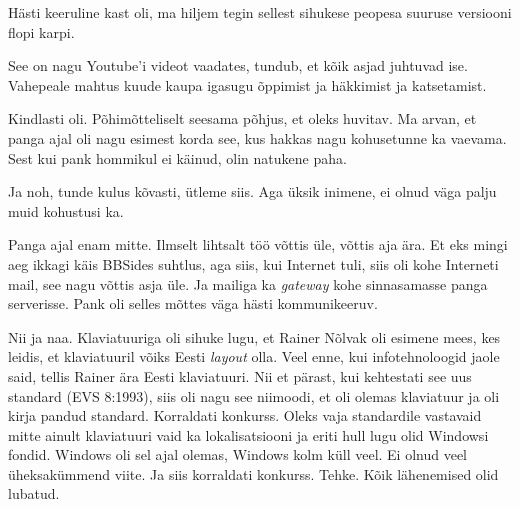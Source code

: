 Hästi keeruline kast oli, ma hiljem tegin  sellest sihukese peopesa suuruse 
versiooni flopi karpi.


See on nagu Youtube'i videot vaadates, tundub, et  kõik asjad juhtuvad ise. 
Vahepeale mahtus kuude kaupa igasugu õppimist ja häkkimist ja katsetamist.


Kindlasti oli. Põhimõtteliselt seesama põhjus, et oleks huvitav. Ma arvan, et 
panga ajal oli nagu esimest korda  see, kus hakkas nagu kohusetunne ka vaevama. 
Sest kui pank  hommikul ei käinud, olin natukene paha.

Ja noh, tunde kulus kõvasti, ütleme siis. Aga üksik inimene,  ei olnud  väga 
palju muid kohustusi ka.


Panga ajal enam mitte. Ilmselt lihtsalt töö võttis üle,  võttis aja ära. Et eks 
mingi aeg ikkagi käis BBSides suhtlus, aga siis, kui Internet tuli, siis oli 
kohe Interneti mail, see nagu võttis asja üle. Ja mailiga ka \emph{gateway} 
kohe sinnasamasse panga serverisse. Pank oli selles mõttes väga 
hästi kommunikeeruv.


Nii ja naa. Klaviatuuriga oli sihuke lugu, et Rainer Nõlvak oli esimene mees, kes leidis, et klaviatuuril võiks Eesti \emph{layout} 
olla. Veel enne, kui infotehnoloogid jaole said, tellis Rainer ära Eesti 
klaviatuuri. Nii et pärast, kui kehtestati see uus standard (EVS 8:1993), siis oli nagu see 
niimoodi, et oli olemas klaviatuur ja oli kirja pandud standard. Korraldati 
konkurss. Oleks vaja standardile vastavaid mitte ainult klaviatuuri vaid 
ka lokalisatsiooni ja eriti hull lugu olid Windowsi fondid. 
Windows oli sel ajal olemas, Windows kolm küll veel. Ei olnud 
veel üheksakümmend viite. Ja siis korraldati konkurss. Tehke. Kõik lähenemised 
olid lubatud.


